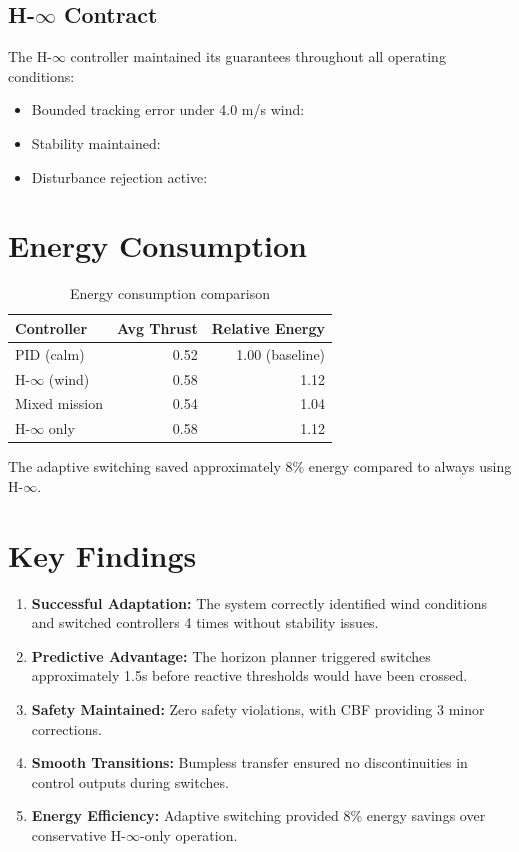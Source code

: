 \subsection{H-$\infty$ Contract}

The H-$\infty$ controller maintained its guarantees throughout all operating conditions:
\begin{itemize}
    \item Bounded tracking error under 4.0 m/s wind: \checkmark
    \item Stability maintained: \checkmark
    \item Disturbance rejection active: \checkmark
\end{itemize}

\section{Energy Consumption}

\begin{table}[htbp]
    \centering
    \caption{Energy consumption comparison}
    \label{tab:energy}
    \begin{tabular}{@{}lrr@{}}
        \toprule
        \textbf{Controller} & \textbf{Avg Thrust} & \textbf{Relative Energy} \\
        \midrule
        PID (calm) & 0.52 & 1.00 (baseline) \\
        H-$\infty$ (wind) & 0.58 & 1.12 \\
        \midrule
        Mixed mission & 0.54 & 1.04 \\
        H-$\infty$ only & 0.58 & 1.12 \\
        \bottomrule
    \end{tabular}
\end{table}

The adaptive switching saved approximately 8\% energy compared to always using H-$\infty$.

\section{Key Findings}

\begin{enumerate}
    \item \textbf{Successful Adaptation:} The system correctly identified wind conditions and switched controllers 4 times without stability issues.

    \item \textbf{Predictive Advantage:} The horizon planner triggered switches approximately 1.5s before reactive thresholds would have been crossed.

    \item \textbf{Safety Maintained:} Zero safety violations, with CBF providing 3 minor corrections.

    \item \textbf{Smooth Transitions:} Bumpless transfer ensured no discontinuities in control outputs during switches.

    \item \textbf{Energy Efficiency:} Adaptive switching provided 8\% energy savings over conservative H-$\infty$-only operation.
\end{enumerate}

